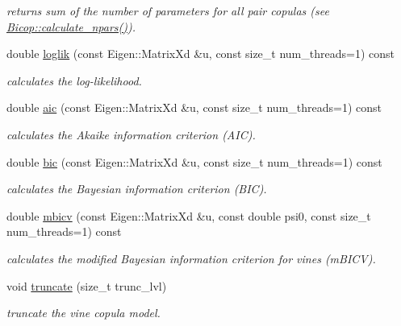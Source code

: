 \begin{DoxyCompactItemize}
$$\begin{DoxyCompactList}\small\item\em returns sum of the number of parameters for all pair copulas (see \hyperlink{classvinecopulib_1_1_bicop_a8e6b3e3dd484d07cafeb24ca3393f5f0}{Bicop\+::calculate\+\_\+npars()}). \end{DoxyCompactList}\item 
double \hyperlink{classvinecopulib_1_1_vinecop_a07e9c59b42d0668df5fc5e69b281272e}{loglik} (const Eigen\+::\+Matrix\+Xd \&u, const size\+\_\+t num\+\_\+threads=1) const
\begin{DoxyCompactList}\small\item\em calculates the log-\/likelihood. \end{DoxyCompactList}\item 
double \hyperlink{classvinecopulib_1_1_vinecop_a082d0c740fcb5610c8d7687cf12a95e4}{aic} (const Eigen\+::\+Matrix\+Xd \&u, const size\+\_\+t num\+\_\+threads=1) const
\begin{DoxyCompactList}\small\item\em calculates the Akaike information criterion (A\+IC). \end{DoxyCompactList}\item 
double \hyperlink{classvinecopulib_1_1_vinecop_a61745ef0b908f6580a5af8fb40221869}{bic} (const Eigen\+::\+Matrix\+Xd \&u, const size\+\_\+t num\+\_\+threads=1) const
\begin{DoxyCompactList}\small\item\em calculates the Bayesian information criterion (B\+IC). \end{DoxyCompactList}\item 
double \hyperlink{classvinecopulib_1_1_vinecop_abb2e75c3531d813125dda78017f0b219}{mbicv} (const Eigen\+::\+Matrix\+Xd \&u, const double psi0, const size\+\_\+t num\+\_\+threads=1) const
\begin{DoxyCompactList}\small\item\em calculates the modified Bayesian information criterion for vines (m\+B\+I\+CV). \end{DoxyCompactList}\item 
void \hyperlink{classvinecopulib_1_1_vinecop_ac77812a69ccd568b7eb0c21658001640}{truncate} (size\+\_\+t trunc\+\_\+lvl)
\begin{DoxyCompactList}\small\item\em truncate the vine copula model. \end{DoxyCompactList}\end{DoxyCompactItemize}
